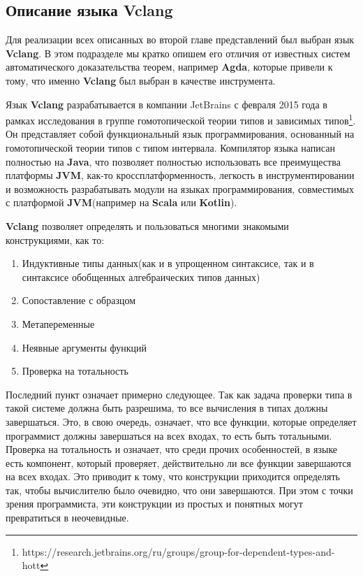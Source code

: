 \subsection{Описание языка Vclang}

Для реализации всех описанных во второй главе представлений был выбран язык \textbf{Vclang}. В этом подразделе мы кратко опишем его отличия от известных систем автоматического доказательства теорем, например \textbf{Agda}, которые привели к тому, что именно \textbf{Vclang} был выбран в качестве инструмента.

Язык \textbf{Vclang} разрабатывается в компании JetBrains с февраля 2015 года в рамках исследования в группе гомотопической теории типов и зависимых типов\footnote{https://research.jetbrains.org/ru/groups/group-for-dependent-types-and-hott}. Он представляет собой функциональный язык программирования, основанный на гомотопической теории типов с типом интервала. Компилятор языка написан полностью на \textbf{Java}, что позволяет полностью использовать все преимущества платформы \textbf{JVM}, как-то кроссплатформенность, легкость в инструментировании и возможность разрабатывать модули на языках программирования, совместимых с платформой \textbf{JVM}(например на \textbf{Scala} или \textbf{Kotlin}).

\textbf{Vclang} позволяет определять и пользоваться многими знакомыми конструкциями, как то:
\begin{enumerate}
  \item Индуктивные типы данных(как и в упрощенном синтаксисе, так и в синтаксисе обобщенных алгебраических типов данных)
  \item Сопоставление с образцом
  \item Метапеременные
  \item Неявные аргументы функций
  \item Проверка на тотальность
\end{enumerate}

Последний пункт означает примерно следующее. Так как задача проверки типа в такой системе должна быть разрешима, то все вычисления в типах должны завершаться. Это, в свою очередь, означает, что все функции, которые определяет программист должны завершаться на всех входах, то есть быть тотальными. Проверка на тотальность и означает, что среди прочих особенностей, в языке есть компонент, который проверяет, действительно ли все функции завершаются на всех входах. Это приводит к тому, что конструкции приходится определять так, чтобы вычислителю было очевидно, что они завершаются. При этом с точки зрения программиста, эти конструкции из простых и понятных могут превратиться в неочевидные.

